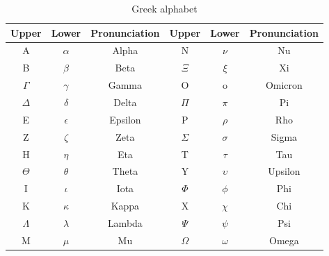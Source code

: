 \documentclass[b5paper]{article}
\begin{document}
 \begin{table}[htbp]
     \centering
     \begin{tabular}{|c|c|c||c|c|c|}
         \hline
               \textbf{Upper} & \textbf{Lower} & \textbf{Pronunciation} & \textbf{Upper} & \textbf{Lower} & \textbf{Pronunciation} \\
         \hline
         A         & $\alpha$    & Alpha &      N         & $\nu$         & Nu \\
         B         & $\beta$     & Beta &       $\Xi$         & $\xi$         & Xi \\
         $\Gamma$  & $\gamma$    & Gamma &      O    & o    & Omicron \\
         $\Delta$  & $\delta$    & Delta &      $\Pi$         & $\pi$         & Pi \\
         E         & $\epsilon$  & Epsilon &    P        & $\rho$        & Rho \\
         Z         & $\zeta$     & Zeta &       $\Sigma$      & $\sigma$      & Sigma \\
         H         & $\eta$      & Eta &        T        & $\tau$        & Tau \\
         $\Theta$  & $\theta$    & Theta &      Y    & $\upsilon$    & Upsilon \\
         I         & $\iota$     & Iota &       $\Phi$        & $\phi$        & Phi \\
         K         & $\kappa$    & Kappa &      X        & $\chi$        & Chi \\
         $\Lambda$ & $\lambda$   & Lambda &     $\Psi$        & $\psi$        & Psi \\
         M         & $\mu$       & Mu &         $\Omega$      & $\omega$      & Omega \\
         \hline
     \end{tabular}
     \caption{Greek alphabet}
     \label{tab:greek-alphabet}
 \end{table}
\end{document}
